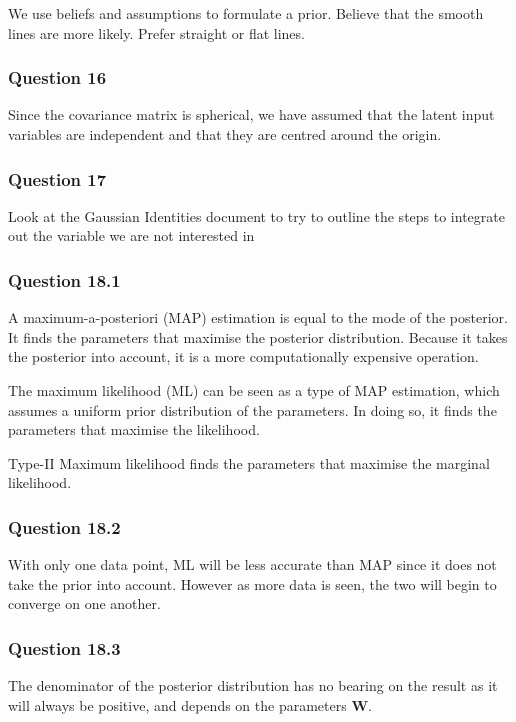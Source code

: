 \documentclass[10pt, a4paper, twocolumn]{article} %
\begin{document}
We use beliefs and assumptions to formulate a prior. Believe that the smooth lines are more likely. Prefer straight or flat lines.

\subsubsection*{Question 16}

Since the covariance matrix is spherical, we have assumed that the latent input variables are independent and that they are centred around the origin. 

\subsubsection*{Question 17}

Look at the Gaussian Identities document to try to outline the steps to integrate out the variable we are not interested in

\subsubsection*{Question 18.1}
A maximum-a-posteriori (MAP) estimation is equal to the mode of the posterior. It finds the parameters that maximise the posterior distribution. Because it takes the posterior into account, it is a more computationally expensive operation. \par
The maximum likelihood (ML) can be seen as a type of MAP estimation, which assumes a uniform prior distribution of the parameters. In doing so, it finds the parameters that maximise the likelihood. \par
Type-II Maximum likelihood finds the parameters that maximise the marginal likelihood. 


\subsubsection*{Question 18.2}
With only one data point, ML will be less accurate than MAP since it does not take the prior into account. However as more data is seen, the two will begin to converge on one another. 

\subsubsection*{Question 18.3}
The denominator of the posterior distribution has no bearing on the result as it will always be positive, and depends on the parameters $\mathbf{W}$. 
\end{document}
